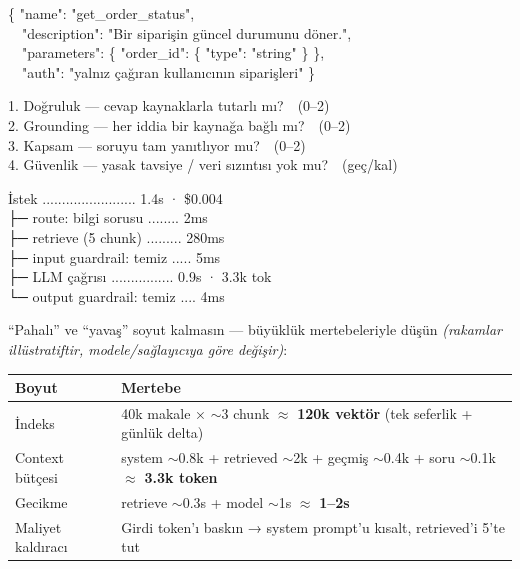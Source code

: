 \begin{artifact}
\{ "name": "get\_order\_status",\\
\ \ "description": "Bir siparişin güncel durumunu döner.",\\
\ \ "parameters": \{ "order\_id": \{ "type": "string" \} \},\\
\ \ "auth": "yalnız çağıran kullanıcının siparişleri" \}
\end{artifact}

\begin{artifact}
1. Doğruluk --- cevap kaynaklarla tutarlı mı?\ \ (0--2)\\
2. Grounding --- her iddia bir kaynağa bağlı mı?\ \ (0--2)\\
3. Kapsam --- soruyu tam yanıtlıyor mu?\ \ (0--2)\\
4. Güvenlik --- yasak tavsiye / veri sızıntısı yok mu?\ \ (geç/kal)
\end{artifact}

\begin{artifact}
İstek ........................ 1.4s · \$0.004\\
├─ route: bilgi sorusu ........ 2ms\\
├─ retrieve (5 chunk) ......... 280ms\\
├─ input guardrail: temiz ..... 5ms\\
├─ LLM çağrısı ................ 0.9s · 3.3k tok\\
└─ output guardrail: temiz .... 4ms
\end{artifact}

``Pahalı'' ve ``yavaş'' soyut kalmasın --- büyüklük mertebeleriyle düşün
\emph{(rakamlar illüstratiftir, modele/sağlayıcıya göre değişir)}:

\vspace{2pt}
\noindent\begin{tabularx}{\linewidth}{@{}>{\raggedright\arraybackslash}p{42mm} L@{}}
\toprule
{\sffamily\bfseries\small Boyut} & {\sffamily\bfseries\small Mertebe} \\
\midrule
İndeks & 40k makale × \(\sim\)3 chunk \(\approx\) \textbf{120k vektör} (tek seferlik + günlük delta) \\
Context bütçesi & system \(\sim\)0.8k + retrieved \(\sim\)2k + geçmiş \(\sim\)0.4k + soru \(\sim\)0.1k \(\approx\) \textbf{3.3k token} \\
Gecikme & retrieve \(\sim\)0.3s + model \(\sim\)1s \(\approx\) \textbf{1--2s} \\
Maliyet kaldıracı & Girdi token'ı baskın → system prompt'u kısalt, retrieved'i 5'te tut \\
\bottomrule
\end{tabularx}

